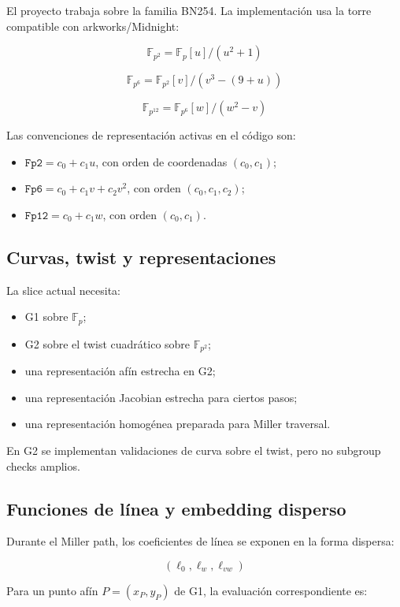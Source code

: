\documentclass[11pt,a4paper]{article}
\begin{document}
El proyecto trabaja sobre la familia BN254. La implementaci\'on usa la torre compatible con
arkworks/Midnight:

\[
\mathbb{F}_{p^2} = \mathbb{F}_p[u]/(u^2 + 1)
\]

\[
\mathbb{F}_{p^6} = \mathbb{F}_{p^2}[v]/(v^3 - (9 + u))
\]

\[
\mathbb{F}_{p^{12}} = \mathbb{F}_{p^6}[w]/(w^2 - v)
\]

Las convenciones de representaci\'on activas en el c\'odigo son:

\begin{itemize}
  \item \(\texttt{Fp2} = c_0 + c_1 u\), con orden de coordenadas \((c_0, c_1)\);
  \item \(\texttt{Fp6} = c_0 + c_1 v + c_2 v^2\), con orden \((c_0, c_1, c_2)\);
  \item \(\texttt{Fp12} = c_0 + c_1 w\), con orden \((c_0, c_1)\).
\end{itemize}

\subsection{Curvas, twist y representaciones}

La slice actual necesita:

\begin{itemize}
  \item G1 sobre \(\mathbb{F}_p\);
  \item G2 sobre el twist cuadr\'atico sobre \(\mathbb{F}_{p^2}\);
  \item una representaci\'on af\'in estrecha en G2;
  \item una representaci\'on Jacobian estrecha para ciertos pasos;
  \item una representaci\'on homog\'enea preparada para Miller traversal.
\end{itemize}

En G2 se implementan validaciones de curva sobre el twist, pero no subgroup checks amplios.

\subsection{Funciones de l\'inea y embedding disperso}

Durante el Miller path, los coeficientes de l\'inea se exponen en la forma dispersa:

\[
(\ell_0,\ell_w,\ell_{vw})
\]

Para un punto af\'in \(P = (x_P, y_P)\) de G1, la evaluaci\'on correspondiente es:
\end{document}
